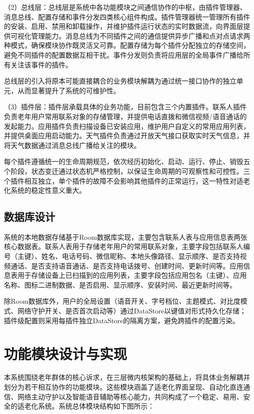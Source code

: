 （2）总线层：总线层是系统中各功能模块之间通信协作的中枢，由插件管理器、消息总线、配置存储和事件分发四类核心组件构成。插件管理器统一管理所有插件的安装、启用、禁用和卸载操作，并维护插件运行状态的实时数据流，向界面层提供可视化管理能力。消息总线为不同插件之间的通信提供异步广播和点对点请求两种模式，确保模块协作既灵活又可靠。配置存储为每个插件分配独立的存储空间，避免不同插件的配置数据互相干扰。事件分发则负责将应用层的全局事件广播给所有关注该事件的插件。

总线层的引入将原本可能直接耦合的业务模块解耦为通过统一接口协作的独立单元，从而显著提升了系统的可维护性。

（3）插件层：插件层承载具体的业务功能，目前包含三个内置插件。联系人插件负责老年用户常用联系对象的存储管理，并提供电话直拨和微信视频/语音通话的发起能力。应用插件负责扫描设备已安装应用，维护用户自定义的常用应用列表，并提供桌面应用启动能力。天气插件负责通过开放天气接口获取实时天气信息，并将天气数据通过消息总线广播给关注的模块。

每个插件遵循统一的生命周期规范，依次经历初始化、启动、运行、停止、销毁五个阶段，状态变迁通过状态机严格控制，以保证生命周期的可观察性和可控性。三个插件相互独立，单个插件的故障不会影响其他插件的正常运行，这一特性对适老化系统的稳定性意义重大。

\subsection{数据库设计}

系统的本地数据存储基于Room数据库实现，主要包含联系人表与应用信息表两张核心数据表。联系人表用于存储老年用户的常用联系对象，主要字段包括联系人编号（主键）、姓名、电话号码、微信昵称、本地头像路径、显示顺序、是否支持视频通话、是否支持语音通话、是否支持电话拨号、创建时间、更新时间等。应用信息表用于存储设备上已扫描到的应用列表，主要字段包括应用包名（主键）、应用名称、图标二进制数据、是否启用、显示顺序、安装时间、最近更新时间等。

除Room数据库外，用户的全局设置（语音开关、字号档位、主题模式、对比度模式、网络守护开关、是否首次启动等）通过DataStore以键值对形式持久化存储；插件级配置则采用每插件独立DataStore的隔离方案，避免跨插件的配置污染。

\section{功能模块设计与实现}

本系统围绕老年群体的核心诉求，在三层微内核架构的基础上，将具体业务解耦并划分为若干相互协作的功能模块。这些模块涵盖了适老化界面呈现、自动化直连通信、网络主动守护以及智能语音辅助等核心能力，共同构成了一个稳定、易用、安全的适老化系统。系统总体模块结构如下图所示：

